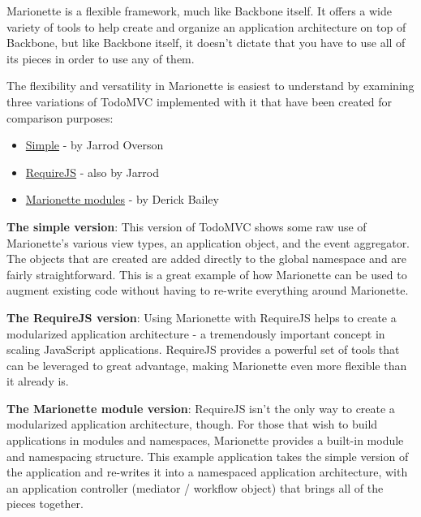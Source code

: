 \documentclass[9pt]{book}
\begin{document}
Marionette is a flexible framework, much like Backbone itself. It offers
a wide variety of tools to help create and organize an application
architecture on top of Backbone, but like Backbone itself, it doesn't
dictate that you have to use all of its pieces in order to use any of
them.

The flexibility and versatility in Marionette is easiest to understand
by examining three variations of TodoMVC implemented with it that have
been created for comparison purposes:

\begin{itemize}
\itemsep1pt\parskip0pt
\item
  \href{https://github.com/jsoverson/todomvc/tree/master/labs/architecture-examples/backbone_marionette}{Simple}
  - by Jarrod Overson
\item
  \href{https://github.com/jsoverson/todomvc/tree/master/labs/dependency-examples/backbone_marionette_require}{RequireJS}
  - also by Jarrod
\item
  \href{https://github.com/derickbailey/todomvc/tree/marionette/labs/architecture-examples/backbone_marionette/js}{Marionette
  modules} - by Derick Bailey
\end{itemize}

\textbf{The simple version}: This version of TodoMVC shows some raw use
of Marionette's various view types, an application object, and the event
aggregator. The objects that are created are added directly to the
global namespace and are fairly straightforward. This is a great example
of how Marionette can be used to augment existing code without having to
re-write everything around Marionette.

\textbf{The RequireJS version}: Using Marionette with RequireJS helps to
create a modularized application architecture - a tremendously important
concept in scaling JavaScript applications. RequireJS provides a
powerful set of tools that can be leveraged to great advantage, making
Marionette even more flexible than it already is.

\textbf{The Marionette module version}: RequireJS isn't the only way to
create a modularized application architecture, though. For those that
wish to build applications in modules and namespaces, Marionette
provides a built-in module and namespacing structure. This example
application takes the simple version of the application and re-writes it
into a namespaced application architecture, with an application
controller (mediator / workflow object) that brings all of the pieces
together.
\end{document}
